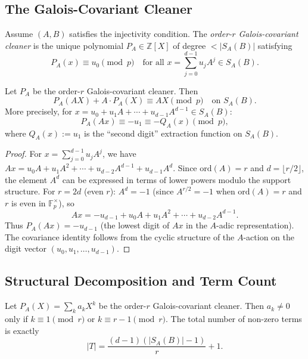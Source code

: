 \subsection{The Galois-Covariant Cleaner}

\begin{definition}
Assume $(A, B)$ satisfies the injectivity condition.
The \emph{order-$r$ Galois-covariant cleaner} is the unique polynomial $P_A \in \mathbb{Z}[X]$ of degree $< |S_A(B)|$ satisfying
\[
P_A(x) \equiv u_0 \pmod{p} \quad \text{for all } x = \sum_{j=0}^{d-1} u_j A^j \in S_A(B).
\]
\end{definition}

\begin{theorem}\label{thm:covariance}
Let $P_A$ be the order-$r$ Galois-covariant cleaner. Then
\[
P_A(AX) + A \cdot P_A(X) \equiv AX \pmod{p} \quad \text{on } S_A(B).
\]
More precisely, for $x = u_0 + u_1 A + \cdots + u_{d-1} A^{d-1} \in S_A(B)$:
\[
P_A(Ax) \equiv -u_1 \equiv -Q_A(x) \pmod{p},
\]
where $Q_A(x) := u_1$ is the ``second digit'' extraction function on $S_A(B)$.
\end{theorem}

\begin{proof}
For $x = \sum_{j=0}^{d-1} u_j A^j$, we have $Ax = u_0 A + u_1 A^2 + \cdots + u_{d-2} A^{d-1} + u_{d-1} A^d$.
Since $\mathrm{ord}(A) = r$ and $d = \lfloor r/2 \rfloor$, the element $A^d$ can be expressed in terms of lower powers modulo the support structure.
For $r = 2d$ (even $r$): $A^d = -1$ (since $A^{r/2} = -1$ when $\mathrm{ord}(A) = r$ and $r$ is even in $\mathbb{F}_p^\times$), so
\[
Ax = -u_{d-1} + u_0 A + u_1 A^2 + \cdots + u_{d-2} A^{d-1}.
\]
Thus $P_A(Ax) = -u_{d-1}$ (the lowest digit of $Ax$ in the $A$-adic representation).
The covariance identity follows from the cyclic structure of the $A$-action on the digit vector $(u_0, u_1, \ldots, u_{d-1})$.
\end{proof}

\subsection{Structural Decomposition and Term Count}

\begin{theorem}\label{thm:termcount}
Let $P_A(X) = \sum_{k} a_k X^k$ be the order-$r$ Galois-covariant cleaner.
Then $a_k \neq 0$ only if $k \equiv 1 \pmod{r}$ or $k \equiv r-1 \pmod{r}$.
The total number of non-zero terms is exactly
\[
|T| = \frac{(d-1)(|S_A(B)| - 1)}{r} + 1.
\]
\end{theorem}


